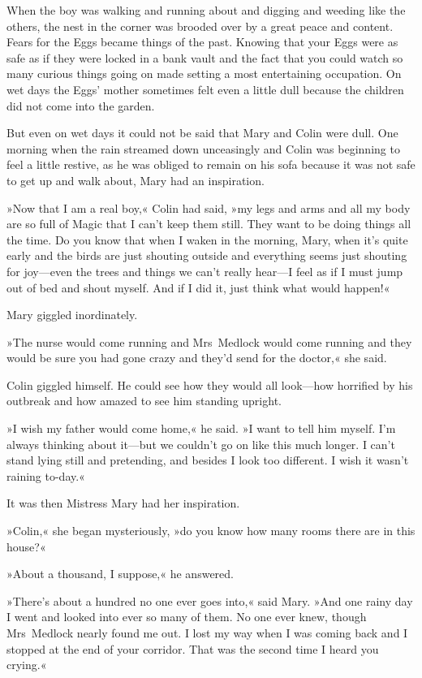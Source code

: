 When the boy was walking and running about and digging and weeding like the others, the nest in the corner was brooded over by a great peace and content. Fears for the Eggs became things of the past. Knowing that your Eggs were as safe as if they were locked in a bank vault and the fact that you could watch so many curious things going on made setting a most entertaining occupation. On wet days the Eggs' mother sometimes felt even a little dull because the children did not come into the garden.

But even on wet days it could not be said that Mary and Colin were dull. One morning when the rain streamed down unceasingly and Colin was beginning to feel a little restive, as he was obliged to remain on his sofa because it was not safe to get up and walk about, Mary had an inspiration.

»Now that I am a real boy,« Colin had said, »my legs and arms and all my body are so full of Magic that I can't keep them still. They want to be doing things all the time. Do you know that when I waken in the morning, Mary, when it's quite early and the birds are just shouting outside and everything seems just shouting for joy—even the trees and things we can't really hear—I feel as if I must jump out of bed and shout myself. And if I did it, just think what would happen!«

Mary giggled inordinately.

»The nurse would come running and Mrs~Medlock would come running and they would be sure you had gone crazy and they'd send for the doctor,« she said.

Colin giggled himself. He could see how they would all look—how horrified by his outbreak and how amazed to see him standing upright.

»I wish my father would come home,« he said. »I want to tell him myself. I'm always thinking about it—but we couldn't go on like this much longer. I can't stand lying still and pretending, and besides I look too different. I wish it wasn't raining to-day.«

It was then Mistress Mary had her inspiration.

»Colin,« she began mysteriously, »do you know how many rooms there are in this house?«

»About a thousand, I suppose,« he answered.

»There's about a hundred no one ever goes into,« said Mary. »And one rainy day I went and looked into ever so many of them. No one ever knew, though Mrs~Medlock nearly found me out. I lost my way when I was coming back and I stopped at the end of your corridor. That was the second time I heard you crying.«


